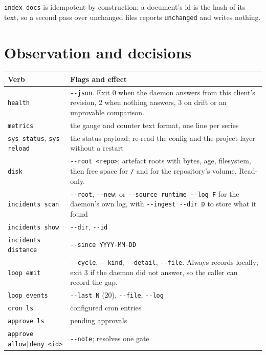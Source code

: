 \texttt{index docs} is idempotent by construction: a document's id is the hash of its text, so
a second pass over unchanged files reports \texttt{unchanged} and writes nothing.

\section{Observation and decisions}

\begin{center}
\begin{tabular}{@{}>{\raggedright\arraybackslash}p{}>{\raggedright\arraybackslash}p{}@{}}
  \toprule
  \textbf{Verb} & \textbf{Flags and effect} \\
  \midrule
  \texttt{health} & \texttt{-{}-json}. Exit 0 when the daemon answers from this client's
    revision, 2 when nothing answers, 3 on drift or an unprovable comparison. \\
  \texttt{metrics} & the gauge and counter text format, one line per series \\
  \texttt{sys status}, \texttt{sys reload} & the status payload; re-read the config and the
    project layer without a restart \\
  \texttt{disk} & \texttt{-{}-root <repo>}; artefact roots with bytes, age, filesystem, then
    free space for \texttt{/} and for the repository's volume. Read-only. \\
  \texttt{incidents scan} & \texttt{-{}-root}, \texttt{-{}-new}; or
    \texttt{-{}-source runtime -{}-log F} for the daemon's own log, with
    \texttt{-{}-ingest -{}-dir D} to store what it found \\
  \texttt{incidents show} & \texttt{-{}-dir}, \texttt{-{}-id} \\
  \texttt{incidents distance} & \texttt{-{}-since YYYY-MM-DD} \\
  \texttt{loop emit} & \texttt{-{}-cycle}, \texttt{-{}-kind}, \texttt{-{}-detail},
    \texttt{-{}-file}. Always records locally; exit 3 if the daemon did not answer, so the
    caller can record the gap. \\
  \texttt{loop events} & \texttt{-{}-last N} (20), \texttt{-{}-file}, \texttt{-{}-log} \\
  \texttt{cron ls} & configured cron entries \\
  \texttt{approve ls} & pending approvals \\
  \texttt{approve allow|deny <id>} & \texttt{-{}-note}; resolves one gate \\

\end{tabular}
\end{center}
